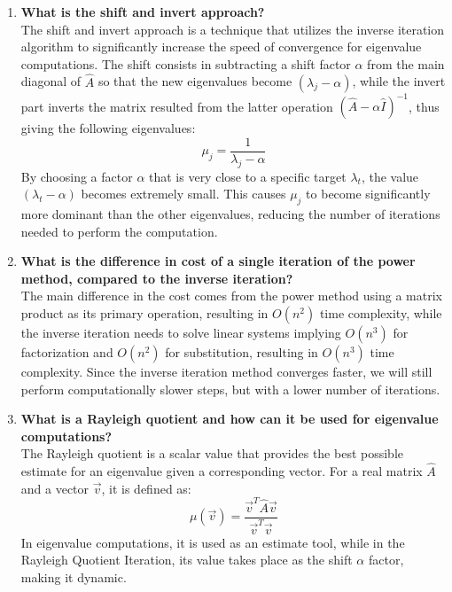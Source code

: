 \documentclass[unicode,11pt,a4paper,oneside,numbers=endperiod,openany]{scrartcl}
\begin{document}
\begin{enumerate}
  \item[(c)] \textbf{What is the shift and invert approach?}
  \\[.5em]
  The shift and invert approach is a technique that utilizes the inverse iteration algorithm to significantly increase the speed of convergence for eigenvalue computations. The shift consists in subtracting a shift factor $\alpha$ from the main diagonal of $\hat{A}$ so that the new eigenvalues become $(\lambda_j - \alpha)$, while the invert part inverts the matrix resulted from the latter operation $(\hat{A} - \alpha\hat{I})^{-1}$, thus giving the following eigenvalues:
  $$
  \mu_j = \frac{1}{\lambda_j - \alpha}
  $$
  By choosing a factor $\alpha$ that is very close to a specific target $\lambda_t$, the value $(\lambda_t - \alpha)$ becomes extremely small. This causes $\mu_j$ to become significantly more dominant than the other eigenvalues, reducing the number of iterations needed to perform the computation.
  
  \item[(d)] \textbf{What is the difference in cost of a single iteration of the power method, compared to the inverse iteration?}
  \\[.5em]
  The main difference in the cost comes from the power method using a matrix product as its primary operation, resulting in $O(n^2)$ time complexity, while the inverse iteration needs to solve linear systems implying $O(n^3)$ for factorization and $O(n^2)$ for substitution, resulting in $O(n^3)$ time complexity. Since the inverse iteration method converges faster, we will still perform computationally slower steps, but with a lower number of iterations. \label{qst:perf}
  
  \item[(e)] \textbf{What is a Rayleigh quotient and how can it be used for eigenvalue computations?}
  \\[.5em]
  The Rayleigh quotient is a scalar value that provides the best possible estimate for an eigenvalue given a corresponding vector. For a real matrix $\hat{A}$ and a vector $\vec{v}$, it is defined as:
  $$
  \mu(\vec{v}) = \frac{\vec{v}^T \hat{A}\vec{v}}{\vec{v}^T\vec{v}}
  $$
  In eigenvalue computations, it is used as an estimate tool, while in the Rayleigh Quotient Iteration, its value takes place as the shift $\alpha$ factor, making it dynamic.
  
\end{enumerate}
\end{document}

